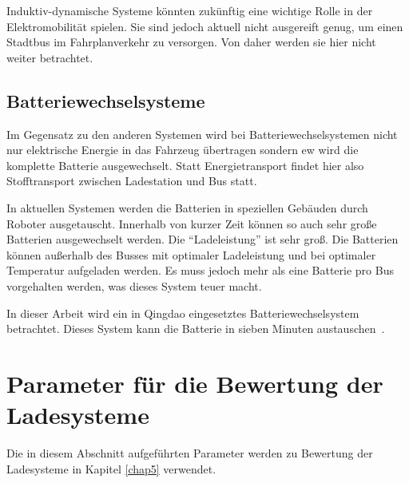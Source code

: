 Induktiv-dynamische Systeme könnten zukünftig eine wichtige Rolle in der Elektromobilität spielen. Sie sind jedoch aktuell nicht ausgereift genug, um einen Stadtbus im Fahrplanverkehr zu versorgen. Von daher werden sie hier nicht weiter betrachtet. 

\subsection{Batteriewechselsysteme}
Im Gegensatz zu den anderen Systemen wird bei Batteriewechselsystemen nicht nur elektrische Energie in das Fahrzeug übertragen sondern ew wird die komplette Batterie ausgewechselt. Statt Energietransport findet hier also Stofftransport zwischen Ladestation und Bus statt. 

In aktuellen Systemen werden die Batterien in speziellen Gebäuden durch Roboter ausgetauscht. Innerhalb von kurzer Zeit können so auch sehr große Batterien ausgewechselt werden. Die "`Ladeleistung"' ist sehr groß. Die Batterien können außerhalb des Busses mit optimaler Ladeleistung und bei optimaler Temperatur aufgeladen werden. Es muss jedoch mehr als eine Batterie pro Bus vorgehalten werden, was dieses System teuer macht.

In dieser Arbeit wird ein in Qingdao eingesetztes Batteriewechselsystem betrachtet. Dieses System kann die Batterie in sieben Minuten austauschen~\cite{swapQingdao}.

\section{Parameter für die Bewertung der Ladesysteme}
\label{parameterDirekt}
Die in diesem Abschnitt aufgeführten Parameter werden zu Bewertung der Ladesysteme in Kapitel \ref{chap5} verwendet.

